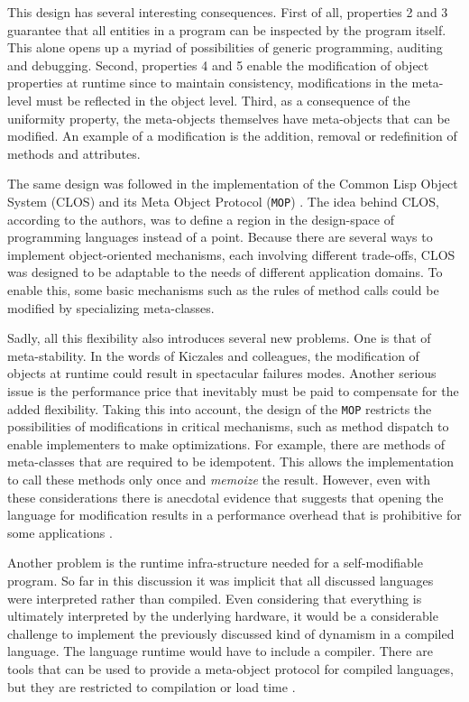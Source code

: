 This design has several interesting consequences. First of all, properties 2 and 3 guarantee that all entities in a program can be
inspected by the program itself. This alone opens up a myriad of possibilities of generic programming, auditing and debugging.
Second, properties 4 and 5 enable the modification of object properties at runtime since to maintain consistency, modifications
in the meta-level must be reflected in the object level. Third, as a consequence of the uniformity property, the meta-objects themselves
have meta-objects that can be modified. An example of a modification is the addition, removal or redefinition of methods and attributes.

The same design was followed in the implementation of the Common Lisp Object System (CLOS) and its Meta Object Protocol (\texttt{MOP}) \cite{Kiczales}.
The idea behind CLOS, according to the authors, was to define a region in the design-space of programming languages instead of
a point. Because there are several ways to implement object-oriented mechanisms, each involving different trade-offs, CLOS was
designed to be adaptable to the needs of different application domains. To enable this, some basic mechanisms such as the
rules of method calls could be modified by specializing meta-classes.

Sadly, all this flexibility also introduces several new problems. One is that of meta-stability. In the words of Kiczales and colleagues,
the modification of objects at runtime could result in spectacular failures modes. Another serious issue is the performance price
that inevitably must be paid to compensate for the added flexibility. Taking this into account, the design of the \texttt{MOP} restricts
the possibilities of modifications in critical mechanisms, such as method dispatch to enable implementers to make optimizations.
For example, there are methods of meta-classes that are required to be idempotent. This allows the implementation to call
these methods only once and \emph{memoize} the result. However, even with these considerations there is anecdotal evidence
that suggests that opening the language for modification results in a performance overhead that is prohibitive for some applications \cite{Lee}.

Another problem is the runtime infra-structure needed for a self-modifiable program. So far in this discussion it was implicit
that all discussed languages were interpreted rather than compiled. Even considering that everything is ultimately interpreted
by the underlying hardware, it would be a considerable challenge to implement the previously discussed kind of dynamism in
a compiled language. The language runtime would have to include a compiler. There are tools that can be used to provide
a meta-object protocol for compiled languages, but they are restricted to compilation or load time \cite{Chiba95} \cite{Chiba2000}.

